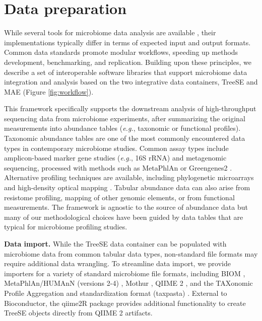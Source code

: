 \documentclass[
  sn-nature,
]{sn-jnl}
\begin{document}
\section{Data preparation}\label{sec-process}

While several tools for microbiome data analysis are available
\citep{jeganathan2021, willis2019, marcoszambrano2023}, their
implementations typically differ in terms of expected input and output
formats. Common data standards promote modular workflows, speeding up
methods development, benchmarking, and replication. Building upon these
principles, we describe a set of interoperable software libraries that
support microbiome data integration and analysis based on the two
integrative data containers, TreeSE and MAE (Figure \ref{fig:workflow}).

This framework specifically supports the downstream analysis of
high-throughput sequencing data from microbiome experiments, after
summarizing the original measurements into abundance tables
(\emph{e.g.}, taxonomic or functional profiles). Taxonomic abundance
tables are one of the most commonly encountered data types in
contemporary microbiome studies. Common assay types include
amplicon-based marker gene studies (\emph{e.g.}, 16S rRNA) and
metagenomic sequencing, processed with methods such as MetaPhlAn
\citep{blanco2023} or Greengenes2 \citep{mcdonald2024}. Alternative
profiling techniques are available, including phylogenetic microarrays
\citep{rajilicstojanovic2009} and high-density optical mapping
\citep{abakumov2024}. Tabular abundance data can also arise from
resistome profiling, mapping of other genomic elements, or from
functional measurements. The framework is agnostic to the source of
abundance data but many of our methodological choices have been guided
by data tables that are typical for microbiome profiling studies.

\textbf{Data import.} While the TreeSE data container can be populated
with microbiome data from common tabular data types, non-standard file
formats may require additional data wrangling. To streamline data
import, we provide importers for a variety of standard microbiome file
formats, including BIOM \citep{mcdonald2012}, MetaPhlAn/HUMAnN (versions
2-4) \citep{beghini2021}, Mothur \citep{schloss2009}, QIIME 2
\citep{bolyen2019}, and the TAXonomic Profile Aggregation and
standardization format (taxpasta) \citep{beber2023}. External to
Bioconductor, the qiime2R package provides additional functionality to
create TreeSE objects directly from QIIME 2 artifacts.
\end{document}
